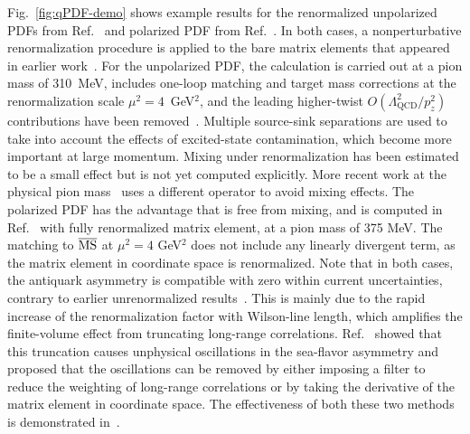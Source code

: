 Fig.~\ref{fig:qPDF-demo} shows example results for the renormalized unpolarized 
PDFs from Ref.~\cite{Chen:2017mzz} and polarized PDF from 
Ref.~\cite{Alexandrou:2017huk}.
In both cases, a nonperturbative renormalization procedure is applied to the 
bare matrix elements that appeared in earlier work~\cite{Lin:2014zya,
Alexandrou:2015rja,Chen:2016utp,Alexandrou:2016jqi,Alexandrou:2016eyt}.
%
For the unpolarized PDF, the calculation is carried out at a pion mass of 
310~MeV, includes one-loop matching and target mass corrections at the 
renormalization scale $\mu^2=4$~GeV$^2$, and the leading higher-twist 
$O(\Lambda_\text{QCD}^2/p_z^2)$ contributions have been 
removed~\cite{Chen:2016utp}. 
%
Multiple source-sink separations are used to take into account the effects of 
excited-state contamination, which become more important at large momentum. 
%
Mixing under renormalization has been estimated to be a small effect but is not 
yet computed explicitly. 
%
More recent work at the physical pion mass~\cite{Lin:2017ani} uses a different 
operator to avoid mixing effects. 
%
The polarized PDF has the advantage that is free from mixing, and is computed in
Ref.~\cite{Alexandrou:2017huk}  with fully renormalized matrix element, 
at a pion mass of 375 MeV. 
%
The matching to $\overline{\rm MS}$ at $\mu^2=4$ GeV$^2$ does not include any 
linearly divergent term, as the matrix element in 
coordinate space is renormalized.
% 
Note that in both cases, the antiquark asymmetry is compatible with zero 
within current uncertainties, contrary to earlier unrenormalized 
results~\cite{Lin:2014zya,Alexandrou:2015rja,Chen:2016utp,Alexandrou:2016eyt}.
%
This is mainly due to the rapid increase of the renormalization factor with 
Wilson-line length, which amplifies the finite-volume effect from truncating 
long-range correlations. 
%
Ref.~\cite{Lin:2017ani} showed that this truncation causes unphysical 
oscillations in the sea-flavor asymmetry and proposed that the oscillations 
can be removed by either imposing a filter to reduce the weighting of 
long-range correlations or by taking the derivative of the matrix element in 
coordinate space. 
%
The effectiveness of both these two methods is 
demonstrated in~\cite{Alexandrou:2017dzj,Lin:2017ani}. 

